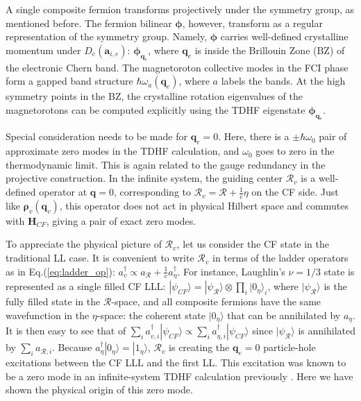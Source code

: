 A single composite fermion transforms projectively under the symmetry group, as mentioned before. The fermion bilinear $\boldsymbol{\phi}$, however, transform as a regular representation of the symmetry group. Namely, $\boldsymbol{\phi}$ carries well-defined crystalline momentum under $D_e(\mathbf a_{i,e})$: $\boldsymbol{\phi}_{\mathbf q_e}$, where $\mathbf q_e$ is inside the Brillouin Zone (BZ) of the electronic Chern band. The magnetoroton collective modes in the FCI phase form a gapped band structure $\hbar\omega_a(\mathbf q_e)$, where $a$ labels the bands. At the high symmetry points in the BZ, the crystalline rotation eigenvalues of the magnetorotons can be computed explicitly using the TDHF eigenstate $\boldsymbol{\phi}_{\mathbf q_e}$.

Special consideration needs to be made for $\mathbf q_e=0$. Here, there is a $\pm\hbar\omega_0$ pair of approximate zero modes in the TDHF calculation, and $\omega_0$ goes to zero in the thermodynamic limit. This is again related to the gauge redundancy in the projective construction. In the infinite system, the guiding center $\mathcal R_v$ is a well-defined operator at $\mathbf q=0$, corresponding to $\mathcal R_v=\mathcal R+\frac{1}{c}\eta$ on the CF side. Just like $\boldsymbol\rho_v(\mathbf q_v)$, this operator does not act in physical Hilbert space and commutes with $\mathbf H_{CF}$, giving a pair of exact zero modes.

To appreciate the physical picture of $\mathcal R_v$, let us consider the CF state in the traditional LL case. It is convenient to write $\mathcal R_v$ in terms of the ladder operators as in Eq.(\ref{eq:ladder_op}): $a^\dagger_{v}\propto a_{\mathcal R}+\frac{1}{c}a_{\eta}^\dagger$. For instance, Laughlin's $\nu=1/3$ state is represented as a single filled CF LLL: $|\psi_{CF}\rangle=|\psi_{\mathcal R}\rangle\otimes \prod_i |0_{\eta}\rangle_i$, where $|\psi_{\mathcal R}\rangle$ is the fully filled state in the $\mathcal R$-space, and all composite fermions have the same wavefunction in the $\eta$-space: the coherent state $|0_{\eta}\rangle$ that can be annihilated by $a_{\eta}$. It is then easy to see that of $\sum_i a^\dagger_{v,i}|\psi_{CF}\rangle\propto\sum_i a^\dagger_{\eta,i}|\psi_{CF}\rangle $ since $|\psi_{\mathcal R}\rangle$ is annihilated by $\sum_i a_{\mathcal R,i}$. Because $a^\dagger_{\eta}|0_{\eta}\rangle=|1_{\eta}\rangle$, $\mathcal R_v$ is creating the $\mathbf q_e=0$ particle-hole excitations between the CF LLL and the first LL. This excitation was known to be a zero mode in an infinite-system TDHF calculation previously \cite{murthy2001hamiltonian}. Here we have shown the physical origin of this zero mode.

